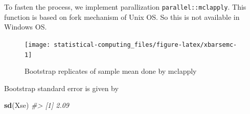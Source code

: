 \documentclass[]{book}
\newenvironment{Shaded}{\begin{snugshade}}{\end{snugshade}}
\newcommand{\CommentTok}[1]{\textcolor[rgb]{0.56,0.35,0.01}{\textit{#1}}}
\newcommand{\ControlFlowTok}[1]{\textcolor[rgb]{0.13,0.29,0.53}{\textbf{#1}}}
\newcommand{\DataTypeTok}[1]{\textcolor[rgb]{0.13,0.29,0.53}{#1}}
\newcommand{\DecValTok}[1]{\textcolor[rgb]{0.00,0.00,0.81}{#1}}
\newcommand{\KeywordTok}[1]{\textcolor[rgb]{0.13,0.29,0.53}{\textbf{#1}}}
\newcommand{\NormalTok}[1]{#1}
\newcommand{\OperatorTok}[1]{\textcolor[rgb]{0.81,0.36,0.00}{\textbf{#1}}}
\newcommand{\StringTok}[1]{\textcolor[rgb]{0.31,0.60,0.02}{#1}}
\theoremstyle{definition}
\theoremstyle{definition}
\theoremstyle{definition}
\theoremstyle{remark}
\begin{document}
To fasten the process, we implement parallization \texttt{parallel::mclapply}. This function is based on fork mechanism of Unix OS. So this is not available in Windows OS.

\begin{Shaded}
\end{Shaded}

\begin{Shaded}
\end{Shaded}

\begin{figure}[H]

{\centering \texttt{[image: statistical-computing\_files/figure-latex/xbarsemc-1]} 

}

\caption{Bootstrap replicates of sample mean done by mclapply}\label{fig:xbarsemc}
\end{figure}

Bootstrap standard error is given by

\begin{Shaded}
\begin{Highlighting}[]
\KeywordTok{sd}\NormalTok{(Xse)}
\CommentTok{#> [1] 2.09}
\end{Highlighting}
\end{Shaded}
\end{document}
